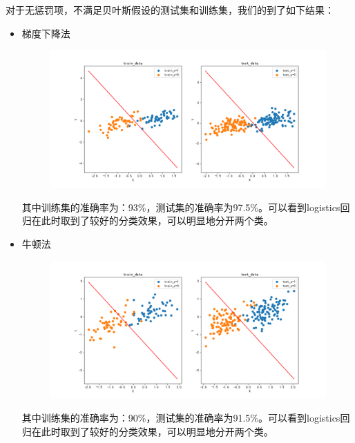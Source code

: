 \documentclass[lang=cn,a4paper,cite=authoryear]{elegantpaper}
\begin{document}
\subsubsection*{}
对于无惩罚项，不满足贝叶斯假设的测试集和训练集，我们的到了如下结果：
\begin{itemize}
	\par
	\item 梯度下降法
	\begin{center}
		\begin{figure}[H]
			\centering
			\includegraphics[scale=0.5]{test04}
		\end{figure}
	\end{center}
	其中训练集的准确率为：93\%，测试集的准确率为97.5\%。可以看到logistics回归在此时取到了较好的分类效果，可以明显地分开两个类。
	\par
	\item 牛顿法
	\begin{center}
		\begin{figure}[H]
			\centering
			\includegraphics[scale=0.5]{nttest04}
		\end{figure}
	\end{center}
	其中训练集的准确率为：90\%，测试集的准确率为91.5\%。可以看到logistics回归在此时取到了较好的分类效果，可以明显地分开两个类。

\end{itemize}
\end{document}
